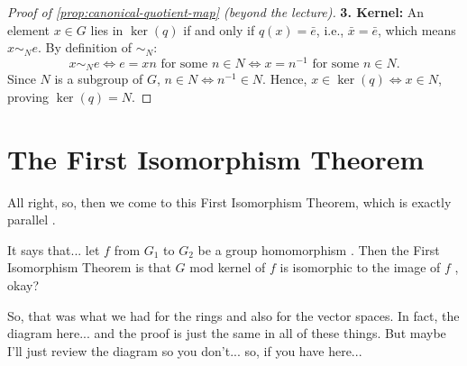 \begin{proofWrapper}
\begin{content}
\begin{proof}[Proof of \cref{prop:canonical-quotient-map} (beyond the lecture)]
\textbf{3. Kernel:} An element $x \in G$ lies in $\ker(q)$ if and only if $q(x) = \bar{e}$, i.e., $\bar{x} = \bar{e}$, which means $x \sim_N e$. By definition of $\sim_N$:
\[
x \sim_N e \iff e = x n \text{ for some } n \in N \iff x = n^{-1} \text{ for some } n \in N.
\]
Since $N$ is a subgroup of $G$, $n \in N \iff n^{-1} \in N$. Hence, $x \in \ker(q) \iff x \in N$, proving $\ker(q) = N$.
\end{proof}
\end{content}

\end{proofWrapper}

\begin{hidden}
\end{hidden}

\section{The First Isomorphism Theorem}

\begin{speech}[01:08:46 - 01:09:43]
All right, so, then we come to this First Isomorphism Theorem, which is exactly parallel .

It says that... let $f$ from $G_1$ to $G_2$ be a group homomorphism . Then the First Isomorphism Theorem is that $G$ mod kernel of $f$ is isomorphic to the image of $f$ , okay?

So, that was what we had for the rings and also for the vector spaces. In fact, the diagram here... and the proof is just the same in all of these things. But maybe I'll just review the diagram so you don't... so, if you have here...
\end{speech}

\begin{content}
\end{content}

